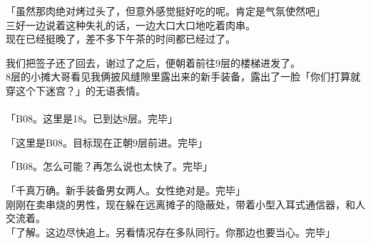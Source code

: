 「虽然那肉绝对烤过头了，但意外感觉挺好吃的呢。肯定是气氛使然吧」\\

三好一边说着这种失礼的话，一边大口大口地吃着肉串。\\

现在已经挺晚了，差不多下午茶的时间都已经过了。

我们把签子还了回去，谢过了之后，便朝着前往9层的楼梯进发了。\\

8层的小摊大哥看见我俩披风缝隙里露出来的新手装备，露出了一脸「你们打算就穿这个下迷宫？」的无语表情。\\

\sqsplit\\

「B08。这里是18。已到达8层。完毕」

「这里是B08。目标现在正朝9层前进。完毕」

「B08。怎么可能？再怎么说也太快了。完毕」

「千真万确。新手装备男女两人。女性绝对是。完毕」\\

刚刚在卖串烧的男性，现在躲在远离摊子的隐蔽处，带着小型入耳式通信器，和人交流着。\\

「了解。这边尽快追上。另看情况存在多队同行。你那边也要当心。完毕」\\

